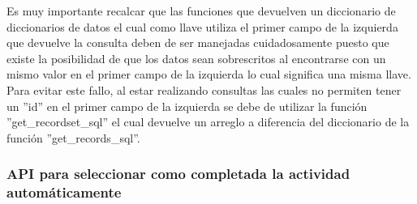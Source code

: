			Es muy importante recalcar que las funciones que devuelven un diccionario de diccionarios de datos el cual como llave utiliza el primer campo de la izquierda que devuelve la consulta deben de ser manejadas cuidadosamente puesto que existe la posibilidad de que los datos sean sobrescritos al encontrarse con un mismo valor en el primer campo de la izquierda lo cual significa una misma llave.\\
			Para evitar este fallo, al estar realizando consultas las cuales no permiten tener un ''id'' en el primer campo de la izquierda se debe de utilizar la función ''get\_recordset\_sql'' el cual devuelve un arreglo a diferencia del diccionario de la función ''get\_records\_sql''.


  \subsubsection{API para seleccionar como completada la actividad automáticamente}


